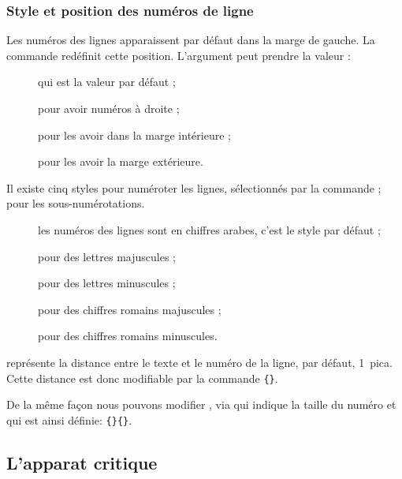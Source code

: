 \subsubsection{Style et position des numéros de ligne}


Les numéros des lignes apparaissent  par défaut dans la marge de gauche. La commande  redéfinit cette position. L'argument peut prendre la valeur :

\begin{description}
\item[] qui est la valeur par défaut ;
\item[] pour avoir numéros  à droite ;
\item[] pour les avoir dans la marge intérieure ;
\item[] pour les avoir la marge extérieure.
\end{description}

Il existe   cinq styles pour numéroter les lignes, sélectionnés par la commande 
 ;  pour les sous-numérotations.

\begin{description} 
\item[] les numéros des lignes sont en chiffres arabes, c'est le style par défaut ; 
\item[] pour des lettres majuscules ;
\item[] pour des lettres minuscules ;
\item[] pour des chiffres romains majuscules ; 
\item[] pour des chiffres romains minuscules. 
\end{description}

 représente la distance entre le texte et le numéro de la ligne, par défaut, 1~pica. 
Cette distance est donc modifiable par la commande \verb|{|\verb|}|. 

De la même façon nous pouvons modifier , via  qui indique la taille du numéro et qui est ainsi définie:
 \verb|{|\verb|}{|\verb|}|. 
 

\subsection{L'apparat critique}


